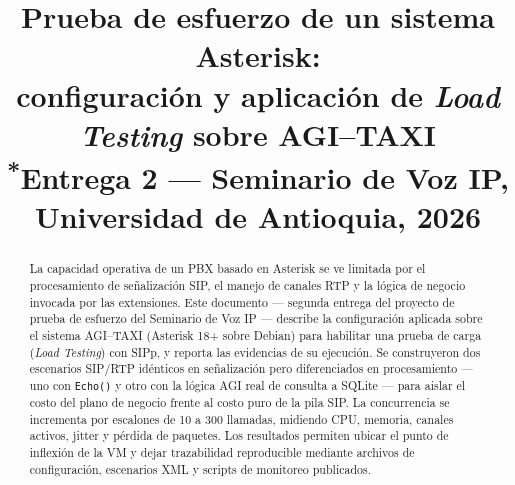 \documentclass[conference]{IEEEtran}
\begin{document}
\title{Prueba de esfuerzo de un sistema Asterisk:\\
configuraci\'on y aplicaci\'on de \textit{Load Testing} sobre AGI--TAXI\\
{\footnotesize \textsuperscript{*}Entrega 2 --- Seminario de Voz IP, Universidad de Antioquia, 2026}
}

\author{
\and
{}
\and
{}
}

\maketitle

\begin{abstract}
La capacidad operativa de un PBX basado en Asterisk se ve limitada por
el procesamiento de se\~nalizaci\'on SIP, el manejo de canales RTP y la
l\'ogica de negocio invocada por las extensiones. Este documento ---
segunda entrega del proyecto de prueba de esfuerzo del Seminario de Voz
IP --- describe la configuraci\'on aplicada sobre el sistema
AGI--TAXI (Asterisk 18+ sobre Debian) para habilitar una prueba de
carga (\textit{Load Testing}) con SIPp, y reporta las evidencias de su
ejecuci\'on. Se construyeron dos escenarios SIP/RTP id\'enticos en
se\~nalizaci\'on pero diferenciados en procesamiento --- uno con
\texttt{Echo()} y otro con la l\'ogica AGI real de consulta a SQLite ---
para aislar el costo del plano de negocio frente al costo puro de la
pila SIP. La concurrencia se incrementa por escalones de 10 a 300
llamadas, midiendo CPU, memoria, canales activos, jitter y p\'erdida de
paquetes. Los resultados permiten ubicar el punto de inflexi\'on de la
VM y dejar trazabilidad reproducible mediante archivos de
configuraci\'on, escenarios XML y scripts de monitoreo publicados.
\end{abstract}
\end{document}
